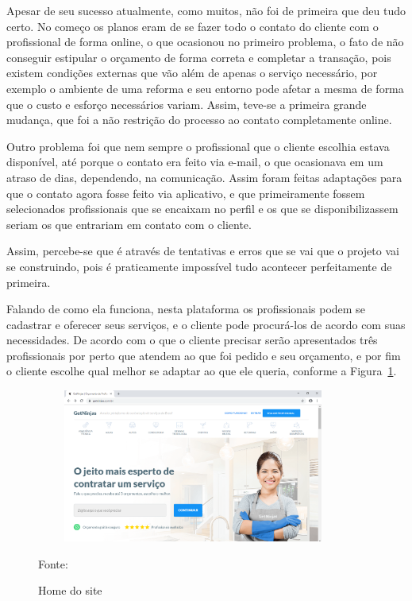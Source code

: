 Apesar de seu sucesso atualmente, como muitos, não foi de primeira que deu tudo certo. No começo os planos eram de se fazer todo o contato do cliente com o profissional de forma online, o que ocasionou no primeiro problema, o fato de não conseguir estipular o orçamento de forma correta e completar a transação, pois existem condições externas que vão além de apenas o serviço necessário, por exemplo o ambiente de uma reforma e seu entorno pode afetar a mesma de forma que o custo e esforço necessários variam. Assim, teve-se a primeira grande mudança, que foi a não restrição do processo ao contato completamente online.

Outro problema foi que nem sempre o profissional que o cliente escolhia estava disponível, até porque o contato era feito via e-mail, o que ocasionava em um atraso de dias, dependendo, na comunicação. Assim foram feitas adaptações para que o contato agora fosse feito via aplicativo, e que primeiramente fossem selecionados profissionais que se encaixam no perfil e os que se disponibilizassem seriam os que entrariam em contato com o cliente.

Assim, percebe-se que é através de tentativas e erros que se vai que o projeto vai se construindo, pois é praticamente impossível tudo acontecer perfeitamente de primeira.

Falando de como ela funciona, nesta plataforma os profissionais podem se cadastrar e oferecer seus serviços, e o cliente pode procurá-los de acordo com suas necessidades. De acordo com o que o cliente precisar serão apresentados três profissionais por perto que atendem ao que foi pedido e seu orçamento, e por fim o cliente escolhe qual melhor se adaptar ao que ele queria, conforme a Figura~\hypersetup{linkcolor=black}\ref{fig:Home}.

\begin{figure}[!h]
	\centering
	\caption{Home do site}
	\includegraphics[width=390px, height=190px]{./images/getninjas.png}
			\label{fig:Home}
	\par {Fonte: \cite{get-ninjas}}
\end{figure}

